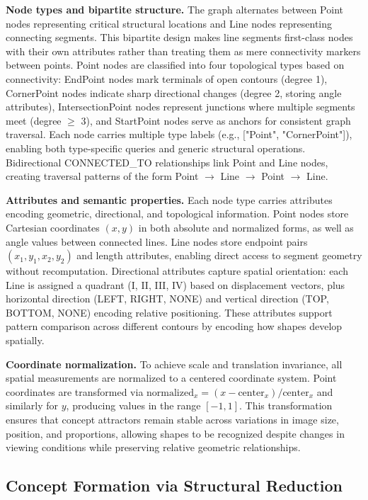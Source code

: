 \documentclass[a4paper,10pt]{article}
\begin{document}
\textbf{Node types and bipartite structure.} The graph alternates between Point nodes representing critical structural locations and Line nodes representing connecting segments. This bipartite design makes line segments first-class nodes with their own attributes rather than treating them as mere connectivity markers between points. Point nodes are classified into four topological types based on connectivity: EndPoint nodes mark terminals of open contours (degree 1), CornerPoint nodes indicate sharp directional changes (degree 2, storing angle attributes), IntersectionPoint nodes represent junctions where multiple segments meet (degree $\geq$ 3), and StartPoint nodes serve as anchors for consistent graph traversal. Each node carries multiple type labels (e.g., ["Point", "CornerPoint"]), enabling both type-specific queries and generic structural operations. Bidirectional CONNECTED\_TO relationships link Point and Line nodes, creating traversal patterns of the form Point $\to$ Line $\to$ Point $\to$ Line.

\textbf{Attributes and semantic properties.} Each node type carries attributes encoding geometric, directional, and topological information. Point nodes store Cartesian coordinates $(x, y)$ in both absolute and normalized forms, as well as angle values between connected lines. Line nodes store endpoint pairs $(x_1, y_1, x_2, y_2)$ and length attributes, enabling direct access to segment geometry without recomputation. Directional attributes capture spatial orientation: each Line is assigned a quadrant (I, II, III, IV) based on displacement vectors, plus horizontal direction (LEFT, RIGHT, NONE) and vertical direction (TOP, BOTTOM, NONE) encoding relative positioning. These attributes support pattern comparison across different contours by encoding how shapes develop spatially.

\textbf{Coordinate normalization.} To achieve scale and translation invariance, all spatial measurements are normalized to a centered coordinate system. Point coordinates are transformed via $\text{normalized}_x = (x - \text{center}_x) / \text{center}_x$ and similarly for $y$, producing values in the range $[-1, 1]$. This transformation ensures that concept attractors remain stable across variations in image size, position, and proportions, allowing shapes to be recognized despite changes in viewing conditions while preserving relative geometric relationships.

\subsection{Concept Formation via Structural Reduction}
\end{document}
